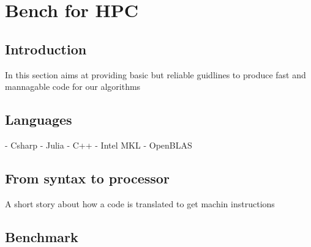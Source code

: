 \chapter{Bench for HPC}

\section{Introduction}

In this section aims at providing basic but reliable guidlines to produce fast and mannagable code
for our algorithms

\cite{Abraham2002}

\section{Languages}
- Csharp
- Julia
- C++
- Intel MKL
- OpenBLAS

\section{From syntax to processor}

A short story about how a code is translated to get machin instructions

\section{Benchmark}


